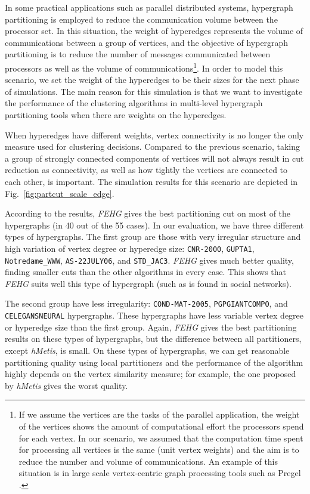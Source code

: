 \documentclass[twocolumn]{svjour3}          \smartqed
\begin{document}
In some practical applications such as parallel distributed systems, hypergraph partitioning is employed to reduce the communication volume between the processor set. In this situation, the weight of hyperedges represents the volume of communications between a group of vertices, and the objective of  hypergraph partitioning is to reduce the number of messages communicated between processors as well as the volume of communications\footnote{If we assume the vertices are the tasks of the parallel application, the weight of the vertices shows the amount of computational effort the processors spend for each vertex. In our scenario, we assumed that the computation time spent for processing all vertices is the same (unit vertex weights) and the aim is to reduce the number and volume of communications. An example of this situation is in large scale vertex-centric graph processing tools such as Pregel \cite{malewicz2010}.}. In order to model this scenario, we set the weight of the hyperedges to be their sizes for the next phase of simulations. The main reason for this simulation is that we want to investigate the performance of the clustering algorithms in multi-level hypergraph partitioning tools when there are weights on the hyperedges. 

When hyperedges have different weights, vertex connectivity is no longer the only measure used for clustering decisions. Compared to the previous scenario, taking a group of strongly connected components of vertices will not always result in cut reduction as connectivity, as well as how tightly the vertices are connected to each other, is important. The simulation results for this scenario are depicted in Fig.~\ref{fig:partcut_scale_edge}. 

According to the results, \textit{FEHG} gives the best partitioning cut on most of the hypergraphs (in 40 out of the 55 cases). In our evaluation, we have three different types of hypergraphs. The first group are those with very irregular structure and high variation of vertex degree or hyperedge size:  \texttt{CNR-2000}, \texttt{GUPTA1}, \texttt{Notredame\_WWW}, \texttt{AS-22JULY06}, and \texttt{STD\_JAC3}. \textit{FEHG} gives much better quality, finding smaller cuts than the other algorithms in every case. This shows that \textit{FEHG} suits well this type of hypergraph (such as is found in social networks). 

The second group have less irregularity:  \texttt{COND-MAT-2005}, \texttt{PGPGIANTCOMPO}, and \texttt{CELEGANSNEURAL} hypergraphs. These hypergraphs have less variable vertex degree or hyperedge size than the first group. Again, \textit{FEHG} gives the best partitioning results on these types of hypergraphs, but the difference between all partitioners, except \textit{hMetis}, is small. On these types of hypergraphs, we can get reasonable partitioning quality using local partitioners and the performance of the algorithm highly depends on the vertex similarity measure; for example, the one proposed by \textit{hMetis} gives the worst quality. 
\end{document}
